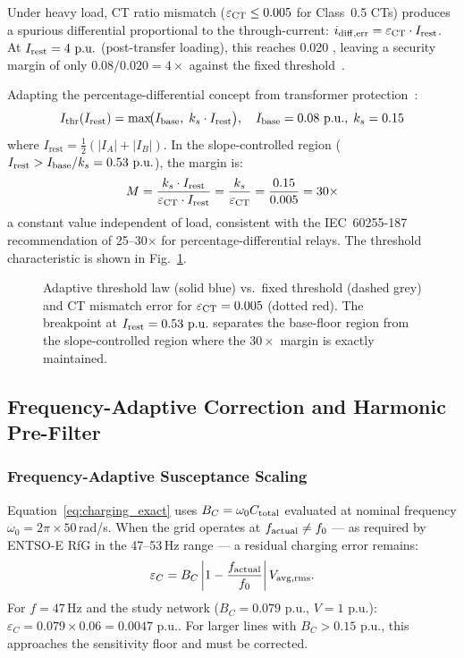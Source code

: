\documentclass[journal,twoside,10pt]{IEEEtran}
\newcommand{\Irest}{I_{\mathrm{rest}}}
\newcommand{\Ithr}{I_{\mathrm{thr}}}
\newcommand{\pu}{\,\text{p.u.}}
\begin{document}
Under heavy load, CT ratio mismatch ($\varepsilon_{\rm CT} \leq 0.005$
for Class~0.5 CTs) produces a spurious differential proportional to the
through-current: $i_{\rm diff,err} = \varepsilon_{\rm CT} \cdot I_{\rm rest}$.
At $I_{\rm rest} = 4\,\pu$ (post-transfer loading), this reaches 0.020\,\pu,
leaving a security margin of only $0.08/0.020 = 4\times$ against the fixed
threshold~\cite{SAMBP_TR17}.

Adapting the percentage-differential concept from transformer
protection~\cite{Blackburn2006,Anderson1999}:
\begin{equation}
  \Ithr(\Irest) = \max\!\bigl(I_{\rm base},\; k_s \cdot \Irest\bigr),
  \quad I_{\rm base} = 0.08\,\pu,\; k_s = 0.15
  \label{eq:thresh}
\end{equation}
where $\Irest = \tfrac{1}{2}(|I_A| + |I_B|)$.  In the slope-controlled
region ($\Irest > I_{\rm base}/k_s = 0.53\,\pu$), the margin is:
\begin{equation}
  M = \frac{k_s \cdot \Irest}{\varepsilon_{\rm CT} \cdot \Irest}
    = \frac{k_s}{\varepsilon_{\rm CT}}
    = \frac{0.15}{0.005} = 30\times
  \label{eq:margin}
\end{equation}
a constant value independent of load, consistent with the IEC~60255-187
recommendation of 25--30$\times$ for percentage-differential relays.
The threshold characteristic is shown in Fig.~\ref{fig:threshold}.

\begin{figure}[!t]
  \centering
  
  \caption{Adaptive threshold law (solid blue) vs.\ fixed threshold (dashed
           grey) and CT mismatch error for $\varepsilon_{\rm CT} = 0.005$ (dotted red).
           The breakpoint at $I_{\rm rest} = 0.53\,\pu$ separates the
           base-floor region from the slope-controlled region where
           the $30\times$ margin is exactly maintained.}
  \label{fig:threshold}
\end{figure}

\subsection{Frequency-Adaptive Correction and Harmonic Pre-Filter}
\label{sec:harmonic}

\subsubsection{Frequency-Adaptive Susceptance Scaling}

Equation~\eqref{eq:charging_exact} uses $B_C = \omega_0 C_{\rm total}$
evaluated at nominal frequency $\omega_0 = 2\pi \times 50\,$rad/s.
When the grid operates at $f_{\rm actual} \neq f_0$ --- as required by
ENTSO-E RfG in the 47--53\,Hz range --- a residual charging error remains:
\begin{equation}
  \varepsilon_C = B_C \left|1 - \frac{f_{\rm actual}}{f_0}\right| V_{\rm avg,rms}.
  \label{eq:freq_error}
\end{equation}
For $f = 47\,\text{Hz}$ and the study network ($B_C = 0.079\,\pu$,
$V = 1\,\pu$): $\varepsilon_C = 0.079 \times 0.06 = 0.0047\,\pu$.
For larger lines with $B_C > 0.15\,\pu$, this approaches the sensitivity
floor and must be corrected.
\end{document}
